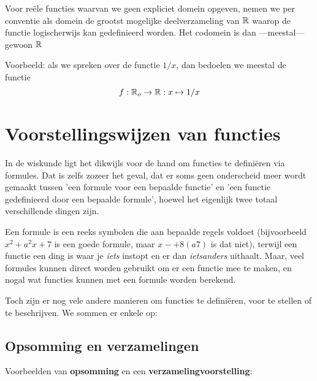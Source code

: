 \documentclass{ximera}
\begin{document}
Voor reële functies waarvan we geen expliciet domein opgeven, nemen we per conventie als domein de grootst mogelijke deelverzameling van $\mathbb{R}$ waarop de functie logischerwijs kan gedefinieerd worden. Het codomein is dan ---meestal--- gewoon $\mathbb{R}$ 

Voorbeeld: als we spreken over de functie $1/x$, dan bedoelen we meestal de functie
$$
f: \mathbb{R}_o \to \mathbb{R}: x\mapsto 1/x
$$






\section{Voorstellingswijzen van functies}
In de wiskunde ligt het dikwijls voor de hand om functies te definiëren via formules. Dat is zelfs zozeer het geval, dat er soms geen onderscheid meer wordt gemaakt tussen 'een formule voor een bepaalde functie' en 'een functie gedefinieerd door een bepaalde formule', hoewel het eigenlijk twee totaal verschillende dingen zijn. 

Een formule is een reeks symbolen die aan bepaalde regels voldoet (bijvoorbeeld $x^2 + a^2x + 7$ is een goede formule, maar $x-+8(a7)$ is dat niet), terwijl een functie een ding is waar je \textit{iets} instopt en er dan \textit{ietsanders} uithaalt. Maar, veel formules kunnen direct worden gebruikt om er een functie mee te maken, en nogal wat functies kunnen met een formule worden berekend. 

Toch zijn er nog vele andere manieren om functies te definiëren, voor te stellen of te beschrijven. We sommen er enkele op:

\subsection{Opsomming en verzamelingen}
Voorbeelden van \textbf{opsomming} en een \textbf{verzamelingvoorstelling}:
\end{document}
